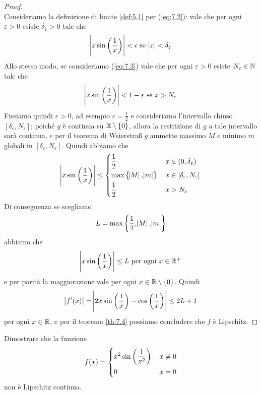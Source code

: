 \begin{proof}
\begin{equation}
    \end{equation}
    Consideriamo la definizione di limite \ref{def:5.1} per (\ref{eq:7.2}): vale che per ogni $\varepsilon>0$ esiste $\delta_\varepsilon>0$ tale che
    \[
    \abs{x\sin\left(\frac{1}{x}\right)}<\epsilon \ \text{se} \ \abs{x}<\delta_\varepsilon
    \]
    Allo stesso modo, se consideriamo (\ref{eq:7.3}) vale che per ogni $\varepsilon>0$ esiste $N_\varepsilon\in\amsbb{N}$ tale che
    \[
    \abs{x\sin\left(\frac{1}{x}\right)}<1-\varepsilon \ \text{se} \ x>N_\varepsilon
    \]
    Fissiamo quindi $\varepsilon>0$, ad esempio $\varepsilon=\frac{1}{2}$ e consideriamo l'intervallo chiuso $[\delta_\varepsilon, N_\varepsilon]$; poiché $g$ è continua su $\amsbb{R}\setminus\{0\}$, allora la restrizione di $g$ a tale intervallo sarà continua, e per il teorema di Weierstra{\ss} $g$ ammette massimo $M$ e minimo $m$ globali in $[\delta_\varepsilon, N_\varepsilon]$. Quindi abbiamo che
    \[
    \abs{x\sin\left(\frac{1}{x}\right)}\le \begin{dcases}
        \frac{1}{2}\, & x\in(0, \delta_\varepsilon)\\
        \max\left\{\abs{M}, \abs{m}\right\}\, & x\in[\delta_\varepsilon, N_\varepsilon]\\
        \frac{1}{2}\, & x>N_\varepsilon
    \end{dcases}
    \]
    Di conseguenza se scegliamo
    \[
    L = \max\left\{\frac{1}{2}, \abs{M}, \abs{m}\right\}
    \]
    abbiamo che
    \[
    \abs{x\sin\left(\frac{1}{x}\right)}\le L \ \text{per ogni} \ x\in\amsbb{R}^+
    \]
    e per parità la maggiorazione vale per ogni $x\in\amsbb{R}\setminus\{0\}$. Quindi
    \[
    \abs{f'(x)}=\abs{2x\sin\left(\frac{1}{x}\right)-\cos\left(\frac{1}{x}\right)}\le 2 L +1
    \]
    per ogni $x\in\amsbb{R}$, e per il teorema \ref{th:7.4} possiamo concludere che $f$ è Lipschitz.
\end{proof}
\begin{exercise}
    \label{ex:7.4}
    Dimostrare che la funzione 
    \[
    f(x) = \begin{dcases}
        x^2 \sin\left(\frac{1}{x^2}\right)\, & x\ne 0\\
        0\, & x=0
    \end{dcases}
    \]
    non è Lipschitz continua.
\end{exercise}
